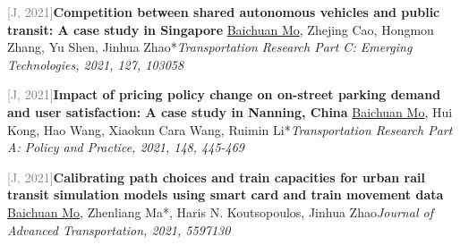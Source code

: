 \par\noindent\begin{minipage}{\linewidth}
{\textcolor{gray}{[J\themyCounter, 2021]\;}}{\textbf{Competition between shared autonomous vehicles and public transit: A case study in Singapore} \href{https://doi.org/10.1016/j.trc.2021.103058}{\textcolor{cadmiumorange}{\faExternalLink}}}{\newline \underline{Baichuan Mo}, Zhejing Cao, Hongmou Zhang, Yu Shen, Jinhua Zhao*}{\newline \emph{Transportation Research Part C: Emerging Technologies, 2021, 127, 103058}}{{\;     }}{}
\end{minipage}\par\vspace{5.5pt}


\par\noindent\begin{minipage}{\linewidth}
{\textcolor{gray}{[J\themyCounter, 2021]\;}}{\textbf{Impact of pricing policy change on on-street parking demand and user satisfaction: A case study in Nanning, China} \href{https://doi.org/10.1016/j.tra.2021.04.013}{\textcolor{cadmiumorange}{\faExternalLink}}}{\newline \underline{Baichuan Mo}, Hui Kong, Hao Wang, Xiaokun Cara Wang, Ruimin Li*}{\newline \emph{Transportation Research Part A: Policy and Practice, 2021, 148, 445-469}}{{\;     }}{}
\end{minipage}\par\vspace{5.5pt}


\par\noindent\begin{minipage}{\linewidth}
{\textcolor{gray}{[J\themyCounter, 2021]\;}}{\textbf{Calibrating path choices and train capacities for urban rail transit simulation models using smart card and train movement data} \href{https://doi.org/10.1155/2021/5597130}{\textcolor{cadmiumorange}{\faExternalLink}}}{\newline \underline{Baichuan Mo}, Zhenliang Ma*, Haris N. Koutsopoulos, Jinhua Zhao}{\newline \emph{Journal of Advanced Transportation, 2021, 5597130}}{{\;    }}{}
\end{minipage}\par\vspace{5.5pt}


